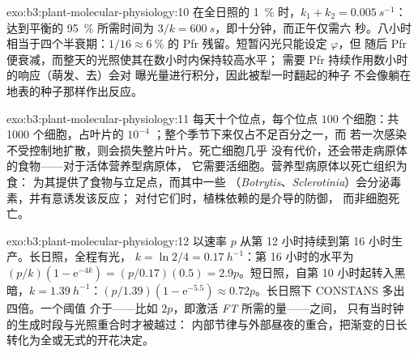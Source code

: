 \begin{solution}{exo:b3:plant-molecular-physiology:10}
在全日照的 \qty{1}{\%} 时，$k_{1} + k_{2} = \qty{0.005}{s^{-1}}$：达到平衡的 95~\%
所需时间为 $3/k = \qty{600}{s}$，即十分钟，而正午仅需六
秒。八小时相当于四个半衰期：$1/16 \approx
\qty{6}{\%}$ 的 Pfr 残留。短暂闪光只能设定 $\varphi$，但
随后 Pfr 便衰减，而整天的光照使其在数小时内保持较高水平；
需要 Pfr 持续作用数小时的响应（萌发、去）会对
曝光量进行积分，因此被犁一时翻起的种子
不会像躺在地表的种子那样作出反应。
\end{solution}

\begin{solution}{exo:b3:plant-molecular-physiology:11}
每天十个位点，每个位点 $100$ 个细胞：共 \num{1000} 个细胞，占叶片的 $10^{-4}$
；整个季节下来仅占不足百分之一，而
若一次感染不受控制地扩散，则会损失整片叶片。死亡细胞几乎
没有代价，还会带走病原体的食物——对于活体营养型病原体，
它需要活细胞。营养型病原体以死亡组织为食：
为其提供了食物与立足点，而其中一些
（\emph{Botrytis}、\emph{Sclerotinia}）会分泌毒素，并有意诱发该反应；
对付它们时，植株依赖的是介导的防御，
而非细胞死亡。
\end{solution}

\begin{solution}{exo:b3:plant-molecular-physiology:12}
以速率 $p$ 从第 12 小时持续到第 16 小时生产。长日照，全程有光，
$k = \ln 2/4 = \qty{0.17}{h^{-1}}$：第 16 小时的水平为 $(p/k)(1 -
\mathrm{e}^{-4k}) = (p/0.17)(0.5) = 2.9p$。短日照，自第
10 小时起转入黑暗，$k = \qty{1.39}{h^{-1}}$：$(p/1.39)(1 - \mathrm{e}^{-5.5})
\approx 0.72p$。长日照下 CONSTANS 多出四倍。一个阈值
介于——比如 $2p$，即激活 \emph{FT} 所需的量——之间，
只有当时钟的生成时段与光照重合时才被越过：
内部节律与外部昼夜的重合，把渐变的日长
转化为全或无式的开花决定。
\end{solution}

